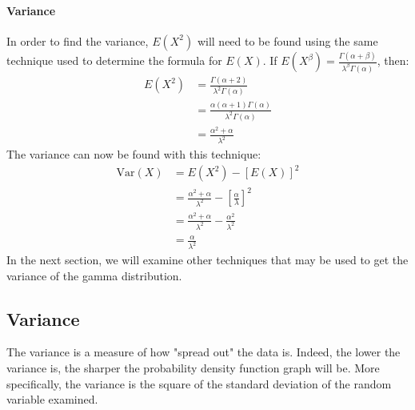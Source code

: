 \documentclass[12pt]{article}
\begin{document}
\paragraph{Variance}
In order to find the variance, $E(X^2)$ will need to be found using the same technique used to determine the formula for
$E(X)$. If $E(X^\beta) = \frac{\Gamma(\alpha+\beta)}{\lambda^\beta \Gamma(\alpha)}$, then:
\begin{equation}
	\begin{split}
		E(X^2)	&=	\frac{\Gamma(\alpha+2)}{\lambda^2 \Gamma(\alpha)}\\
				&=	\frac{\alpha(\alpha+1)\Gamma(\alpha)}{\lambda^2 \Gamma(\alpha)}\\
				&=	\frac{\alpha^2+\alpha}{\lambda^2}
	\end{split}
\end{equation}
The variance can now be found with this technique:
\begin{equation}
	\begin{split}
		\text{Var}(X)	&=	E(X^2) - [E(X)]^2\\
						&=	\frac{\alpha^2+\alpha}{\lambda^2} - \left[\frac{\alpha}{\lambda}\right]^2\\
						&=	\frac{\alpha^2+\alpha}{\lambda^2} - \frac{\alpha^2}{\lambda^2}\\
						&=	\frac{\alpha}{\lambda^2}
	\end{split}
\end{equation}
In the next section, we will examine other techniques that may be used to get the variance of the gamma distribution.


\pagebreak
\subsection{Variance}\label{subsec:gamma:variance}
The variance is a measure of how "spread out" the data is. Indeed, the lower the variance is, the sharper the
probability density function graph will be. More specifically, the variance is the square of the standard
deviation of the random variable examined\cite{wikipediaVariance2022}.
\end{document}
